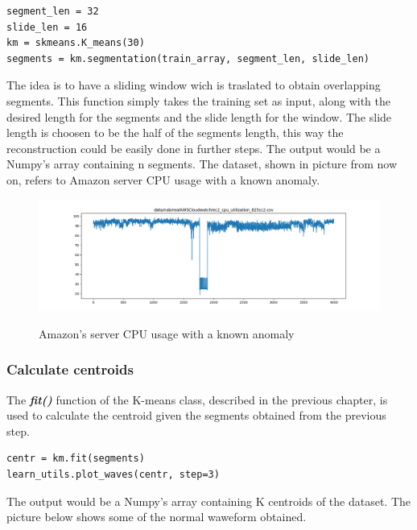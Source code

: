 \documentclass[12pt]{article}
\begin{document}
			\begin{lstlisting}
segment_len = 32
slide_len = 16
km = skmeans.K_means(30)
segments = km.segmentation(train_array, segment_len, slide_len)
			\end{lstlisting}
			
			The idea is to have a sliding window wich is traslated to obtain overlapping segments.
			This function simply takes the training set as input, along with the desired length for the segments and the slide length for the window. The slide length is choosen to be the half of the segments length, this way the reconstruction could be easily done in further steps. The output would be a Numpy's array containing n segments. The dataset, shown in picture from now on, refers to Amazon server CPU usage with a known anomaly.
			
			\begin{figure}[h!]
				\centering
				\includegraphics[scale=0.40]{img/dataset.png}
				\label{fig5}
				\caption{Amazon's server CPU usage with a known anomaly }
			\end{figure}
			
		\subsubsection{Calculate centroids}
		
			The \textbf{\textit{fit()}} function of the K-means class, described in the previous chapter, is used to calculate the centroid given the segments obtained from the previous step.  
			\begin{lstlisting}
centr = km.fit(segments)
learn_utils.plot_waves(centr, step=3)
			\end{lstlisting}	
			The output would be a Numpy's array containing K centroids of the dataset. The picture below shows some of the normal waweform obtained.
			
\end{document}
